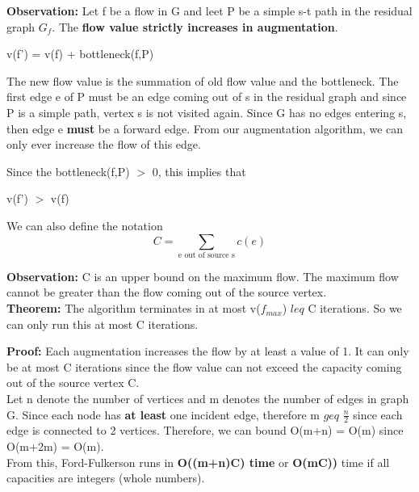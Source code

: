 \documentclass[11pt, oneside]{article}
\theoremstyle{definition}
\begin{document}
\textbf{Observation:} Let f be a flow in G and leet P be a simple s-t path in the residual graph $G_f$. The \textbf{flow value strictly increases in augmentation}.
\begin{center}
v(f') = v(f) + bottleneck(f,P)

The new flow value is the summation of old flow value and the bottleneck. The first edge e of P must be an edge coming out of s in the residual graph and since P is a simple path, vertex s is not visited again. Since G has no edges entering s, then edge e \textbf{must} be a forward edge. From our augmentation algorithm, we can only ever increase the flow of this edge.

Since the bottleneck(f,P) $>$ 0, this implies that

v(f') $>$ v(f)
\end{center}

We can also define the notation
\begin{equation}
  C = \sum_{\text{e out of source s}}c(e)
\end{equation}

\textbf{Observation:} C is an upper bound on the maximum flow. The maximum flow cannot be greater than the flow coming out of the source vertex.\\

\textbf{Theorem:} The algorithm terminates in at most v($f_{max}$) $leq$ C iterations. So we can only run this at most C iterations.

\textbf{Proof:} Each augmentation increases the flow by at least a value of 1. It can only be at most C iterations since the flow value can not exceed the capacity coming out of the source vertex C.\\

Let n denote the number of vertices and m denotes the number of edges in graph G. Since each node has \textbf{at least} one incident edge, therefore m $geq$ $\frac{n}{2}$ since each edge is connected to 2 vertices. Therefore, we can bound O(m+n) = O(m) since O(m+2m) = O(m).\\

From this, Ford-Fulkerson runs in \textbf{O((m+n)C) time} or \textbf{O(mC))} time if all capacities are integers (whole numbers).
\end{document}
